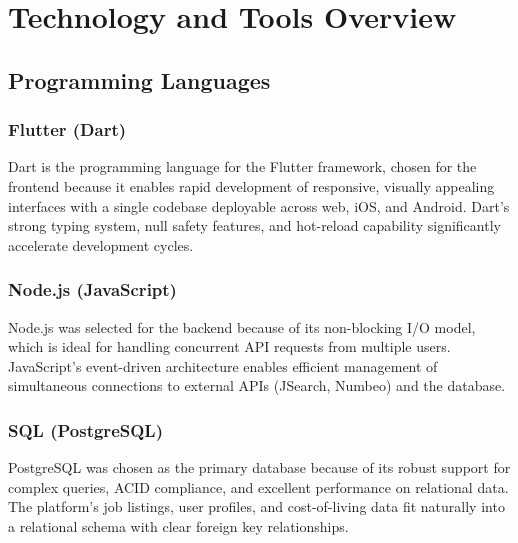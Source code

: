 
\chapter{Technology and Tools Overview}

\section{Programming Languages}

\subsection{Flutter (Dart)}

Dart is the programming language for the Flutter framework, chosen for the frontend because it enables rapid development of responsive, visually appealing interfaces with a single codebase deployable across web, iOS, and Android. Dart's strong typing system, null safety features, and hot-reload capability significantly accelerate development cycles.

\subsection{Node.js (JavaScript)}

Node.js was selected for the backend because of its non-blocking I/O model, which is ideal for handling concurrent API requests from multiple users. JavaScript's event-driven architecture enables efficient management of simultaneous connections to external APIs (JSearch, Numbeo) and the database.

\subsection{SQL (PostgreSQL)}

PostgreSQL was chosen as the primary database because of its robust support for complex queries, ACID compliance, and excellent performance on relational data. The platform's job listings, user profiles, and cost-of-living data fit naturally into a relational schema with clear foreign key relationships.

